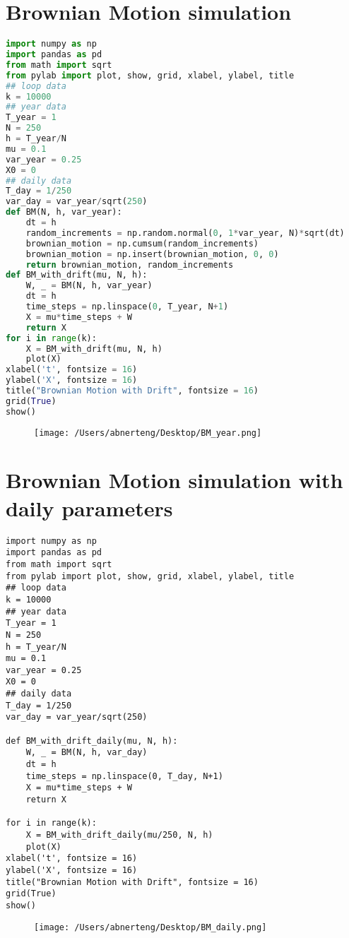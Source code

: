 \documentclass[12pt]{article}
\begin{document}
\section{Brownian Motion simulation}
\begin{lstlisting}[language = Python]
import numpy as np
import pandas as pd
from math import sqrt
from pylab import plot, show, grid, xlabel, ylabel, title
## loop data
k = 10000
## year data
T_year = 1
N = 250
h = T_year/N
mu = 0.1
var_year = 0.25
X0 = 0
## daily data
T_day = 1/250
var_day = var_year/sqrt(250)
def BM(N, h, var_year):
    dt = h
    random_increments = np.random.normal(0, 1*var_year, N)*sqrt(dt)
    brownian_motion = np.cumsum(random_increments)
    brownian_motion = np.insert(brownian_motion, 0, 0)
    return brownian_motion, random_increments
def BM_with_drift(mu, N, h):
    W, _ = BM(N, h, var_year)
    dt = h
    time_steps = np.linspace(0, T_year, N+1)
    X = mu*time_steps + W
    return X
for i in range(k):
    X = BM_with_drift(mu, N, h)
    plot(X)
xlabel('t', fontsize = 16)
ylabel('X', fontsize = 16)
title("Brownian Motion with Drift", fontsize = 16)
grid(True)
show()
\end{lstlisting}
\begin{figure}[H]
    \centering
    \texttt{[image: /Users/abnerteng/Desktop/BM\_year.png]}
\end{figure}
\section*{Brownian Motion simulation with daily parameters}
\begin{lstlisting}
import numpy as np
import pandas as pd
from math import sqrt
from pylab import plot, show, grid, xlabel, ylabel, title
## loop data
k = 10000
## year data
T_year = 1
N = 250
h = T_year/N
mu = 0.1
var_year = 0.25
X0 = 0
## daily data
T_day = 1/250
var_day = var_year/sqrt(250)

def BM_with_drift_daily(mu, N, h):
    W, _ = BM(N, h, var_day)
    dt = h
    time_steps = np.linspace(0, T_day, N+1)
    X = mu*time_steps + W
    return X

for i in range(k):
    X = BM_with_drift_daily(mu/250, N, h)
    plot(X)
xlabel('t', fontsize = 16)
ylabel('X', fontsize = 16)
title("Brownian Motion with Drift", fontsize = 16)
grid(True)
show()
\end{lstlisting}
\begin{figure}[H]
    \centering
    \texttt{[image: /Users/abnerteng/Desktop/BM\_daily.png]}
\end{figure}
\end{document}
